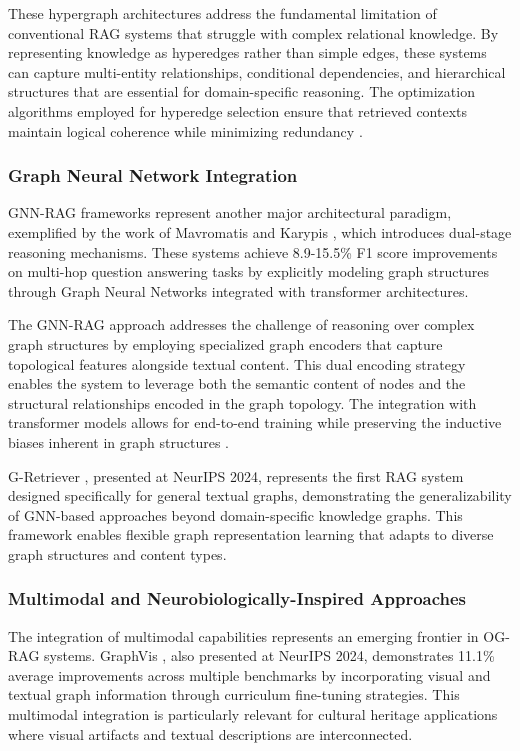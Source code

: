These hypergraph architectures address the fundamental limitation of conventional RAG systems that struggle with complex relational knowledge. By representing knowledge as hyperedges rather than simple edges, these systems can capture multi-entity relationships, conditional dependencies, and hierarchical structures that are essential for domain-specific reasoning. The optimization algorithms employed for hyperedge selection ensure that retrieved contexts maintain logical coherence while minimizing redundancy \cite{chen2024og}.

\subsubsection{Graph Neural Network Integration}

GNN-RAG frameworks represent another major architectural paradigm, exemplified by the work of Mavromatis and Karypis \cite{mavromatis2024gnnrag}, which introduces dual-stage reasoning mechanisms. These systems achieve 8.9-15.5\% F1 score improvements on multi-hop question answering tasks by explicitly modeling graph structures through Graph Neural Networks integrated with transformer architectures.

The GNN-RAG approach addresses the challenge of reasoning over complex graph structures by employing specialized graph encoders that capture topological features alongside textual content. This dual encoding strategy enables the system to leverage both the semantic content of nodes and the structural relationships encoded in the graph topology. The integration with transformer models allows for end-to-end training while preserving the inductive biases inherent in graph structures \cite{mavromatis2024gnnrag}.

G-Retriever \cite{he2024gretriever}, presented at NeurIPS 2024, represents the first RAG system designed specifically for general textual graphs, demonstrating the generalizability of GNN-based approaches beyond domain-specific knowledge graphs. This framework enables flexible graph representation learning that adapts to diverse graph structures and content types.

\subsubsection{Multimodal and Neurobiologically-Inspired Approaches}

The integration of multimodal capabilities represents an emerging frontier in OG-RAG systems. GraphVis \cite{zhang2024graphvis}, also presented at NeurIPS 2024, demonstrates 11.1\% average improvements across multiple benchmarks by incorporating visual and textual graph information through curriculum fine-tuning strategies. This multimodal integration is particularly relevant for cultural heritage applications where visual artifacts and textual descriptions are interconnected.

